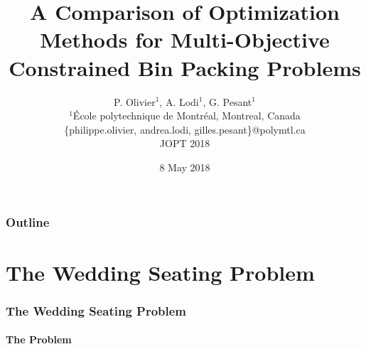 \documentclass{beamer}
\title[Comparison of Optimization Methods]{A Comparison of Optimization Methods for Multi-Objective Constrained Bin Packing Problems}
\author[P. Olivier, A. Lodi, G. Pesant] {
  P. Olivier$^1$, A. Lodi$^1$, G. Pesant$^1$ \\
  \vspace{0.5cm}
  \scriptsize $^1$École polytechnique de Montréal, Montreal, Canada \\
  \{philippe.olivier, andrea.lodi, gilles.pesant\}@polymtl.ca \\
  \vspace{1cm}
  \normalsize JOPT 2018
}
\date[JOPT 2018]{8 May 2018}
\newcommand{\CustomSectionTitle}{}
\begin{document}
\begin{frame}
  \titlepage
\end{frame}

\begin{frame}
  \frametitle{Outline}
  \tableofcontents
\end{frame}




\renewcommand{\CustomSectionTitle}{The Wedding Seating Problem}

\section{\CustomSectionTitle}

\frame{\tableofcontents[currentsection]}




\begin{frame}
  \frametitle{\CustomSectionTitle}
  \framesubtitle{The Problem}
  \begin{center}
  \end{center}
\end{frame}


\end{document}
